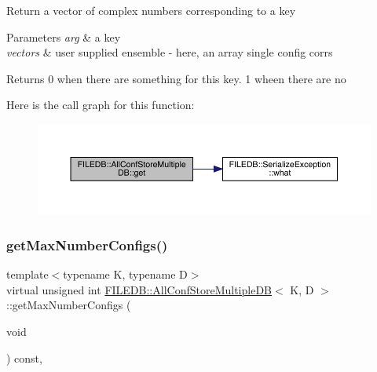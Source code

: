 Return a vector of complex numbers corresponding to a key 
\begin{DoxyParams}{Parameters}
{\em arg} & a key \\
\hline
{\em vectors} & user supplied ensemble -\/ here, an array single config corrs \\
\hline
\end{DoxyParams}
\begin{DoxyReturn}{Returns}
0 when there are something for this key. 1 wheen there are no 
\end{DoxyReturn}
Here is the call graph for this function\+:
\nopagebreak
\begin{figure}[H]
\begin{center}
\leavevmode
\includegraphics[width=350pt]{d5/dbe/classFILEDB_1_1AllConfStoreMultipleDB_a3a9858458bf0ecc76133e1c448568cf5_cgraph}
\end{center}
\end{figure}
\mbox{\label{classFILEDB_1_1AllConfStoreMultipleDB_a9348ec8716b4c716df67dca608bb1bde}} 
\subsubsection{\texorpdfstring{getMaxNumberConfigs()}{getMaxNumberConfigs()}\hspace{0.1cm}{\footnotesize\ttfamily [1/2]}}
{\footnotesize\ttfamily template$<$typename K, typename D$>$ \\
virtual unsigned int \mbox{\hyperlink{classFILEDB_1_1AllConfStoreMultipleDB}{F\+I\+L\+E\+D\+B\+::\+All\+Conf\+Store\+Multiple\+DB}}$<$ K, D $>$\+::get\+Max\+Number\+Configs (\begin{DoxyParamCaption}\item[{void}]{ }\end{DoxyParamCaption}) const\hspace{0.3cm}{\ttfamily [inline]}, {\ttfamily [virtual]}}


